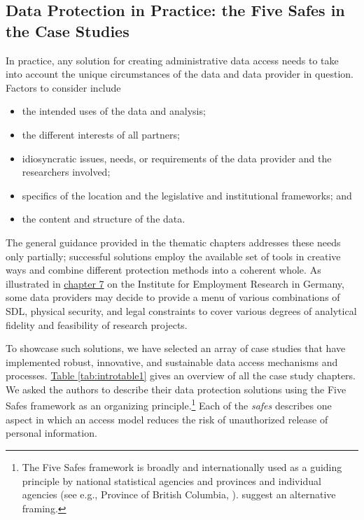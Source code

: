 \documentclass[
]{book}
\providecommand{\tightlist}{%
  \setlength{\itemsep}{0pt}\setlength{\parskip}{0pt}}
\begin{document}
\hypertarget{data-protection-in-practice-the-five-safes-in-the-case-studies}{%
\subsection{Data Protection in Practice: the Five Safes in the Case Studies}\label{data-protection-in-practice-the-five-safes-in-the-case-studies}}

In practice, any solution for creating administrative data access needs to take into account the unique circumstances of the data and data provider in question. Factors to consider include

\begin{itemize}
\tightlist
\item
  the intended uses of the data and analysis;
\item
  the different interests of all partners;
\item
  idiosyncratic issues, needs, or requirements of the data provider and the researchers involved;
\item
  specifics of the location and the legislative and institutional frameworks; and
\item
  the content and structure of the data.
\end{itemize}

The general guidance provided in the thematic chapters addresses these needs only partially; successful solutions employ the available set of tools in creative ways and combine different protection methods into a coherent whole. As illustrated in \protect\hyperlink{iab}{chapter 7} on the Institute for Employment Research in Germany, some data providers may decide to provide a menu of various combinations of SDL, physical security, and legal constraints to cover various degrees of analytical fidelity and feasibility of research projects.

To showcase such solutions, we have selected an array of case studies that have implemented robust, innovative, and sustainable data access mechanisms and processes. \href{https://drive.google.com/file/d/11QOJs0fXgLJp9W74SpWCti2_glpmonHC/view?usp=sharing}{Table \ref{tab:introtable1}} gives an overview of all the case study chapters. We asked the authors to describe their data protection solutions using the Five Safes framework \citep{desai2016} as an organizing principle.\footnote{The Five Safes framework is broadly and internationally used as a guiding principle by national statistical agencies \citep{australianbureauofstatistics2017, statisticscanada2018} and provinces and individual agencies (see e.g., Province of British Columbia, \citet{bcministryofcitizensservices}). \citet{altman2015} suggest an alternative framing.} Each of the \emph{safes} describes one aspect in which an access model reduces the risk of unauthorized release of personal information.
\end{document}
